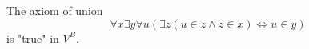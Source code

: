 The axiom of union
$$\forall x \exists y \forall u \left( \exists z (u \in z \land z \in x) \Leftrightarrow u \in y \right)$$
is "true" in $V^B$.